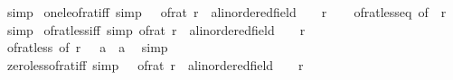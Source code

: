 \begin{isabellebody}
\ simp%
\endisatagproof
{\isafoldproof}%
%
\isadelimproof
\isanewline
%
\endisadelimproof
\isanewline
{}\isamarkupfalse%
\ one{\isacharunderscore}{\kern0pt}le{\isacharunderscore}{\kern0pt}of{\isacharunderscore}{\kern0pt}rat{\isacharunderscore}{\kern0pt}iff\ {\isacharbrackleft}{\kern0pt}simp{\isacharbrackright}{\kern0pt}{\isacharcolon}{\kern0pt}\ {\isachardoublequoteopen}{}\ {\isasymle}\ {\isacharparenleft}{\kern0pt}of{\isacharunderscore}{\kern0pt}rat\ r\ {\isacharcolon}{\kern0pt}{\isacharcolon}{\kern0pt}\ {\isacharprime}{\kern0pt}a{\isacharcolon}{\kern0pt}{\isacharcolon}{\kern0pt}linordered{\isacharunderscore}{\kern0pt}field{\isacharparenright}{\kern0pt}\ {\isasymlongleftrightarrow}\ {}\ {\isasymle}\ r{\isachardoublequoteclose}\isanewline
%
\isadelimproof
\ \ %
\endisadelimproof
%
\isatagproof
{}\isamarkupfalse%
\ of{\isacharunderscore}{\kern0pt}rat{\isacharunderscore}{\kern0pt}less{\isacharunderscore}{\kern0pt}eq\ {\isacharbrackleft}{\kern0pt}of\ {}\ r{\isacharbrackright}{\kern0pt}\ \isamarkupfalse%
\ simp%
\endisatagproof
{\isafoldproof}%
%
\isadelimproof
\isanewline
%
\endisadelimproof
\isanewline
{}\isamarkupfalse%
\ of{\isacharunderscore}{\kern0pt}rat{\isacharunderscore}{\kern0pt}less{\isacharunderscore}{\kern0pt}{}{\isacharunderscore}{\kern0pt}iff\ {\isacharbrackleft}{\kern0pt}simp{\isacharbrackright}{\kern0pt}{\isacharcolon}{\kern0pt}\ {\isachardoublequoteopen}{\isacharparenleft}{\kern0pt}of{\isacharunderscore}{\kern0pt}rat\ r\ {\isacharcolon}{\kern0pt}{\isacharcolon}{\kern0pt}\ {\isacharprime}{\kern0pt}a{\isacharcolon}{\kern0pt}{\isacharcolon}{\kern0pt}linordered{\isacharunderscore}{\kern0pt}field{\isacharparenright}{\kern0pt}\ {\isacharless}{\kern0pt}\ {}\ {\isasymlongleftrightarrow}\ r\ {\isacharless}{\kern0pt}\ {}{\isachardoublequoteclose}\isanewline
%
\isadelimproof
\ \ %
\endisadelimproof
%
\isatagproof
{}\isamarkupfalse%
\ of{\isacharunderscore}{\kern0pt}rat{\isacharunderscore}{\kern0pt}less\ {\isacharbrackleft}{\kern0pt}of\ r\ {}{\isacharcomma}{\kern0pt}\ \ {\isacharprime}{\kern0pt}a\ {\isacharequal}{\kern0pt}\ {\isacharprime}{\kern0pt}a{\isacharbrackright}{\kern0pt}\ \isamarkupfalse%
\ simp%
\endisatagproof
{\isafoldproof}%
%
\isadelimproof
\isanewline
%
\endisadelimproof
\isanewline
{}\isamarkupfalse%
\ zero{\isacharunderscore}{\kern0pt}less{\isacharunderscore}{\kern0pt}of{\isacharunderscore}{\kern0pt}rat{\isacharunderscore}{\kern0pt}iff\ {\isacharbrackleft}{\kern0pt}simp{\isacharbrackright}{\kern0pt}{\isacharcolon}{\kern0pt}\ {\isachardoublequoteopen}{}\ {\isacharless}{\kern0pt}\ {\isacharparenleft}{\kern0pt}of{\isacharunderscore}{\kern0pt}rat\ r\ {\isacharcolon}{\kern0pt}{\isacharcolon}{\kern0pt}\ {\isacharprime}{\kern0pt}a{\isacharcolon}{\kern0pt}{\isacharcolon}{\kern0pt}linordered{\isacharunderscore}{\kern0pt}field{\isacharparenright}{\kern0pt}\ {\isasymlongleftrightarrow}\ {}\ {\isacharless}{\kern0pt}\ r{\isachardoublequoteclose}\isanewline

\end{isabellebody}
